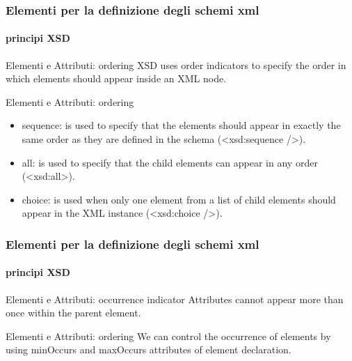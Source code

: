 \begin{frame}
	\frametitle{Elementi per la definizione degli schemi xml}
	\framesubtitle{principi XSD}
	\addtocounter{nframe}{1}

	\begin{block}{Elementi e Attributi: ordering}
		 XSD uses order indicators to specify the order in which elements should appear inside an XML node.
	\end{block}

	\begin{block}{Elementi e Attributi: ordering}
		\begin{itemize}
			\item sequence: is used to specify that the elements should appear in exactly the same order as they are defined in the schema (<xsd:sequence />).
			\item all: is used to specify that the child elements can appear in any order (<xsd:all>). 
			\item choice: is used when only one element from a list of child elements should appear in the XML instance (<xsd:choice />).
		\end{itemize}
	\end{block}
\end{frame}

\begin{frame}
	\frametitle{Elementi per la definizione degli schemi xml}
	\framesubtitle{principi XSD}
	\addtocounter{nframe}{1}

	\begin{block}{Elementi e Attributi: occurrence indicator}
		Attributes cannot appear more than once within the parent element.
	\end{block}

	\begin{block}{Elementi e Attributi: ordering}
		We can control the occurrence of elements by using minOccurs and maxOccurs attributes of element declaration. 
	\end{block}
\end{frame}


